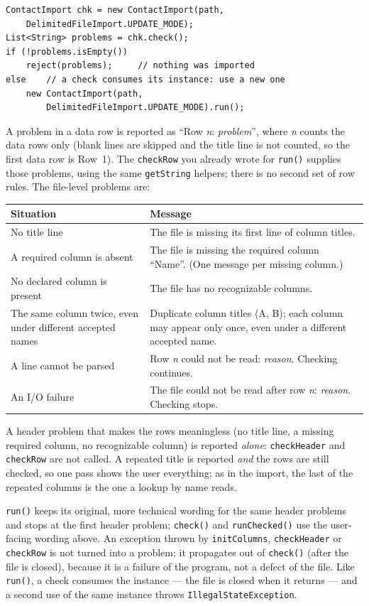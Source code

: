\begin{lstlisting}[style=java]
ContactImport chk = new ContactImport(path,
    DelimitedFileImport.UPDATE_MODE);
List<String> problems = chk.check();
if (!problems.isEmpty())
    reject(problems);     // nothing was imported
else    // a check consumes its instance: use a new one
    new ContactImport(path,
        DelimitedFileImport.UPDATE_MODE).run();
\end{lstlisting}

A problem in a data row is reported as ``Row \emph{n}: \emph{problem}'', where \emph{n} counts the data rows only (blank lines are skipped and the title line is not counted, so the first data row is Row~1).  The \texttt{checkRow} you already wrote for \texttt{run()} supplies those problems, using the same \texttt{getString} helpers; there is no second set of row rules.  The file-level problems are:

\begin{longtable}{P{4.2cm}P{6.3cm}}
\toprule
\textbf{Situation} & \textbf{Message} \\
\midrule
\endhead
No title line & The file is missing its first line of column titles. \\
A required column is absent & The file is missing the required column ``Name''.  (One message per missing column.) \\
No declared column is present & The file has no recognizable columns. \\
The same column twice, even under different accepted names & Duplicate column titles (A, B); each column may appear only once, even under a different accepted name. \\
A line cannot be parsed & Row \emph{n} could not be read: \emph{reason}.  Checking continues. \\
An I/O failure & The file could not be read after row \emph{n}: \emph{reason}.  Checking stops. \\
\bottomrule
\end{longtable}

A header problem that makes the rows meaningless (no title line, a missing required column, no recognizable column) is reported \emph{alone}: \texttt{checkHeader} and \texttt{checkRow} are not called.  A repeated title is reported \emph{and} the rows are still checked, so one pass shows the user everything; as in the import, the last of the repeated columns is the one a lookup by name reads.

\texttt{run()} keeps its original, more technical wording for the same header problems and stops at the first header problem; \texttt{check()} and \texttt{runChecked()} use the user-facing wording above.  An exception thrown by \texttt{initColumns}, \texttt{checkHeader} or \texttt{checkRow} is not turned into a problem; it propagates out of \texttt{check()} (after the file is closed), because it is a failure of the program, not a defect of the file.  Like \texttt{run()}, a check consumes the instance --- the file is closed when it returns --- and a second use of the same instance throws \texttt{IllegalStateException}.

